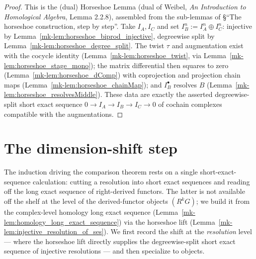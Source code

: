 \begin{proof}
  \leanok
  This is the (dual) Horseshoe Lemma (dual of Weibel, \emph{An Introduction to
  Homological Algebra}, Lemma 2.2.8), assembled from the sub-lemmas of \S``The horseshoe
  construction, step by step''. Take \(I_A, I_C\) and set \(I_B^n := I_A^n \oplus I_C^n\):
  injective by Lemma~\ref{mk-lem:horseshoe_biprod_injective}, degreewise split by
  Lemma~\ref{mk-lem:horseshoe_degree_split}. The twist \(\tau\) and augmentation exist with
  the cocycle identity (Lemma~\ref{mk-lem:horseshoe_twist}, via
  Lemma~\ref{mk-lem:horseshoe_stage_mono}); the matrix differential then squares to zero
  (Lemma~\ref{mk-lem:horseshoe_dComp}) with coprojection and projection chain maps
  (Lemma~\ref{mk-lem:horseshoe_chainMap}); and \(I_B^\bullet\) resolves \(B\)
  (Lemma~\ref{mk-lem:horseshoe_resolvesMiddle}). These data are exactly the asserted
  degreewise-split short exact sequence \(0 \to I_A \to I_B \to I_C \to 0\) of cochain
  complexes compatible with the augmentations.
\end{proof}

\section{The dimension-shift step}

The induction driving the comparison theorem rests on a single short-exact-sequence
calculation: cutting a resolution into short exact sequences and reading off the
long exact sequence of right-derived functors. The latter is not available off the
shelf at the level of the derived-functor objects \((R^k G)\); we build it from the
complex-level homology long exact sequence
(Lemma~\ref{mk-lem:homology_long_exact_sequence}) via the horseshoe lift
(Lemma~\ref{mk-lem:injective_resolution_of_ses}). We first record the shift at the
\emph{resolution} level — where the horseshoe lift directly supplies the
degreewise-split short exact sequence of injective resolutions — and then specialize
to objects.

